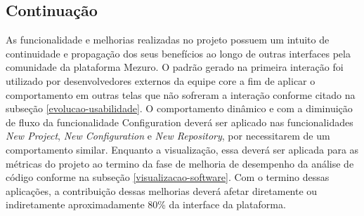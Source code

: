 \subsection{Continuação}
As funcionalidade e melhorias realizadas no projeto possuem um intuito de continuidade e propagação dos seus benefícios ao longo de outras interfaces pela comunidade da plataforma Mezuro. O padrão gerado na primeira interação foi utilizado por desenvolvedores externos da equipe core a fim de aplicar o comportamento em outras telas que não sofreram a interação conforme citado na subseção \ref{evolucao-usabilidade}. O comportamento dinâmico e com a diminuição de fluxo da funcionalidade Configuration deverá ser aplicado nas funcionalidades \textit{New Project}, \textit{New Configuration} e \textit{New Repository}, por necessitarem de um comportamento similar. Enquanto a visualização, essa deverá ser aplicada para as métricas do projeto ao termino da fase de melhoria de desempenho da análise de código conforme na subseção \ref{visualizacao-software}. Com o termino dessas aplicações, a contribuição dessas melhorias deverá afetar diretamente ou indiretamente aproximadamente 80\% da interface da plataforma.

